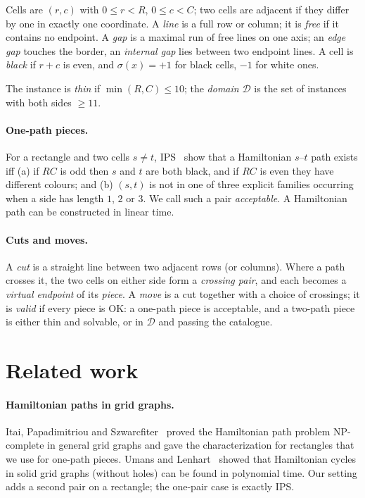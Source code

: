 \documentclass[11pt]{article}
\newcommand{\Dom}{\mathcal{D}}
\begin{document}
Cells are $(r, c)$ with $0 \le r < R$, $0 \le c < C$; two cells are adjacent if they differ by one
in exactly one coordinate. A \emph{line} is a full row or column; it is \emph{free} if it contains no
endpoint. A \emph{gap} is a maximal run of free lines on one axis; an \emph{edge gap} touches the
border, an \emph{internal gap} lies between two endpoint lines. A cell is \emph{black} if $r + c$
is even, and $\sigma(x) = +1$ for black cells, $-1$ for white ones.

The instance is \emph{thin} if $\min(R, C) \le 10$; the \emph{domain} $\Dom$ is the set of
instances with both sides $\ge 11$.

\paragraph{One-path pieces.}
For a rectangle and two cells $s \ne t$, IPS~\cite{ips82} show that a Hamiltonian $s$--$t$ path
exists iff (a) if $RC$ is odd then $s$ and $t$ are both black, and if $RC$ is even they have
different colours; and (b) $(s, t)$ is not in one of three explicit families occurring when a side
has length $1$, $2$ or $3$. We call such a pair \emph{acceptable}. A Hamiltonian path can be
constructed in linear time.

\paragraph{Cuts and moves.}
A \emph{cut} is a straight line between two adjacent rows (or columns). Where a path crosses it,
the two cells on either side form a \emph{crossing pair}, and each becomes a \emph{virtual endpoint}
of its \emph{piece}. A \emph{move} is a cut together with a choice of crossings; it is \emph{valid}
if every piece is OK: a one-path piece is acceptable, and a two-path piece is either thin and
solvable, or in $\Dom$ and passing the catalogue.

\section{Related work}\label{sec:related}

\paragraph{Hamiltonian paths in grid graphs.}
Itai, Papadimitriou and Szwarcfiter~\cite{ips82} proved the Hamiltonian path problem NP-complete in
general grid graphs and gave the characterization for rectangles that we use for one-path pieces.
Umans and Lenhart~\cite{umans97} showed that Hamiltonian cycles in solid grid graphs (without
holes) can be found in polynomial time. Our setting adds a second pair on a rectangle; the
one-pair case is exactly IPS.
\end{document}
